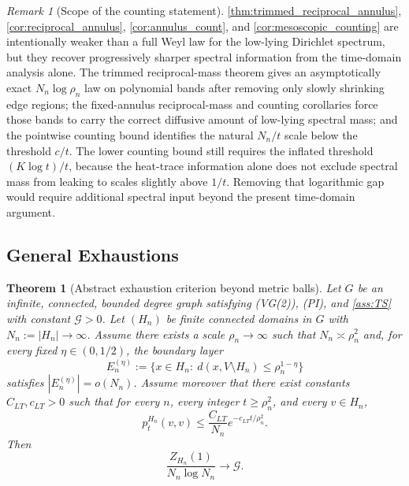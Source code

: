 \documentclass[reqno]{amsart}
\numberwithin{equation}{section}
\newtheorem{theorem}{Theorem}[section]
\theoremstyle{definition}
\theoremstyle{remark}
\newtheorem{remark}[remark]{Remark}
\newcommand{\Cref}[1]{\autoref{#1}}
\newcommand{\cG}{\mathcal{G}}
\begin{document}
\begin{remark}[Scope of the counting statement]\label{rem:mesoscopic_not_weyl}
\Cref{thm:trimmed_reciprocal_annulus}, \Cref{cor:reciprocal_annulus}, \Cref{cor:annulus_count}, and \Cref{cor:mesoscopic_counting} are intentionally weaker than a full Weyl law for the low-lying Dirichlet spectrum, but they recover progressively sharper spectral information from the time-domain analysis alone. The trimmed reciprocal-mass theorem gives an asymptotically exact $N_n\log\rho_n$ law on polynomial bands after removing only slowly shrinking edge regions; the fixed-annulus reciprocal-mass and counting corollaries force those bands to carry the correct diffusive amount of low-lying spectral mass; and the pointwise counting bound identifies the natural $N_n/t$ scale below the threshold $c/t$. The lower counting bound still requires the inflated threshold $(K\log t)/t$, because the heat-trace information alone does not exclude spectral mass from leaking to scales slightly above $1/t$. Removing that logarithmic gap would require additional spectral input beyond the present time-domain argument.
\end{remark}

\subsection{General Exhaustions}

\begin{theorem}[Abstract exhaustion criterion beyond metric balls]\label{thm:general_exhaustion}
Let $G$ be an infinite, connected, bounded degree graph satisfying \textup{(VG(2))}, \textup{(PI)}, and \Cref{ass:TS} with constant $\cG>0$. Let $(H_n)$ be finite connected domains in $G$ with $N_n:=|H_n|\to\infty$. Assume there exists a scale $\rho_n\to\infty$ such that $N_n\asymp \rho_n^2$ and, for every fixed $\eta\in(0,1/2)$, the boundary layer
\[
  E_n^{(\eta)}:=\{x\in H_n:\ d(x,V\setminus H_n)\le \rho_n^{1-\eta}\}
\]
satisfies $|E_n^{(\eta)}|=o(N_n)$. Assume moreover that there exist constants $C_{LT},c_{LT}>0$ such that for every $n$, every integer $t\ge \rho_n^2$, and every $v\in H_n$,
\[
  p_t^{H_n}(v,v)\le \frac{C_{LT}}{N_n} e^{-c_{LT}t/\rho_n^2}.
\]
Then
\[
  \frac{Z_{H_n}(1)}{N_n\log N_n}\longrightarrow \cG.
\]
\end{theorem}
\end{document}

